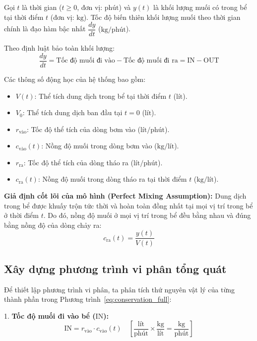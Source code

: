 \documentclass[14pt]{extarticle}
\begin{document}
Gọi $t$ là thời gian ($t \ge 0$, đơn vị: $\text{phút}$) và $y(t)$ là khối lượng muối có trong bể tại thời điểm $t$ (đơn vị: $\text{kg}$). Tốc độ biến thiên khối lượng muối theo thời gian chính là đạo hàm bậc nhất $\dfrac{dy}{dt}$ ($\text{kg/phút}$).

Theo định luật bảo toàn khối lượng:
\begin{equation}
\frac{dy}{dt} = \text{Tốc độ muối đi vào} - \text{Tốc độ muối đi ra} = \text{IN} - \text{OUT}
\label{eq:conservation_full}
\end{equation}

Các thông số động học của hệ thống bao gồm:
\begin{itemize}
    \item $V(t)$: Thể tích dung dịch trong bể tại thời điểm $t$ ($\text{lít}$).
    \item $V_0$: Thể tích dung dịch ban đầu tại $t = 0$ ($\text{lít}$).
    \item $r_{\text{vào}}$: Tốc độ thể tích của dòng bơm vào ($\text{lít/phút}$).
    \item $c_{\text{vào}}(t)$: Nồng độ muối trong dòng bơm vào ($\text{kg/lít}$).
    \item $r_{\text{ra}}$: Tốc độ thể tích của dòng tháo ra ($\text{lít/phút}$).
    \item $c_{\text{ra}}(t)$: Nồng độ muối trong dòng tháo ra tại thời điểm $t$ ($\text{kg/lít}$).
\end{itemize}

\textbf{Giả định cốt lõi của mô hình (Perfect Mixing Assumption):}
Dung dịch trong bể được khuấy trộn tức thời và hoàn toàn đồng nhất tại mọi vị trí trong bể ở thời điểm $t$. Do đó, nồng độ muối ở mọi vị trí trong bể đều bằng nhau và đúng bằng nồng độ của dòng chảy ra:
\begin{equation}
c_{\text{ra}}(t) = \frac{y(t)}{V(t)}
\end{equation}

\subsection{Xây dựng phương trình vi phân tổng quát}
Để thiết lập phương trình vi phân, ta phân tích thứ nguyên vật lý của từng thành phần trong Phương trình~\eqref{eq:conservation_full}:

1. \textbf{Tốc độ muối đi vào bể ($\text{IN}$):}
$$\text{IN} = r_{\text{vào}} \cdot c_{\text{vào}}(t) \quad \left[\frac{\text{lít}}{\text{phút}} \times \frac{\text{kg}}{\text{lít}} = \frac{\text{kg}}{\text{phút}}\right]$$
\end{document}
